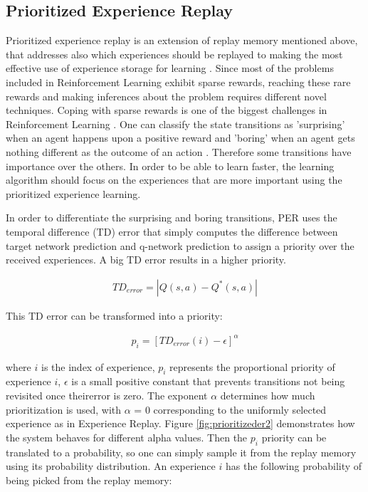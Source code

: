 \documentclass{ituphdreport}
\begin{document}
\subsection{Prioritized Experience Replay}
Prioritized experience replay is an extension of replay memory mentioned above, that addresses also which experiences should be replayed to making the most effective use of experience storage for learning \cite{schaul2015prioritized}. Since most of the problems included in Reinforcement Learning exhibit sparse rewards, reaching these rare rewards and making inferences about the problem requires different novel techniques. Coping with sparse rewards is one of the biggest challenges in Reinforcement Learning \cite{andrychowicz2017hindsight}. One can classify the state transitions as 'surprising' when an agent happens upon a positive reward and 'boring' when an agent gets nothing different as the outcome of an action \cite{kaelbling1996reinforcement}. Therefore some transitions have importance over the others. In order to be able to learn faster, the learning algorithm should focus on the experiences that are more important using the prioritized experience learning. 

In order to differentiate the surprising and boring transitions, PER uses the temporal difference (TD) error that simply computes the difference between target network prediction and q-network prediction to assign a priority over the received experiences. A big TD error results in a higher priority. 

\begin{equation}
\begin{aligned}
TD_{error} = | Q(s,a) - Q^*(s,a)|
\end{aligned}
\end{equation}

This TD error can be transformed into a priority:

\begin{equation}
\begin{aligned}
p_i = [TD_{error}(i) - \epsilon]^\alpha
\end{aligned}
\end{equation}

where $i$ is the index of experience, $p_i$ represents the proportional priority of experience $i$, $\epsilon$ is a small positive constant that prevents transitions not being revisited once theirerror is zero. The exponent  $\alpha$ determines how much prioritization is
used, with $\alpha$ = 0 corresponding to the uniformly selected experience as in Experience Replay. Figure \ref{fig:prioritizeder2} demonstrates how the system behaves for different alpha values. Then the $p_i$ priority can be translated to a probability, so one can simply sample it from the replay memory using its probability distribution. An experience $i$ has the following probability of being picked from the replay memory:
\end{document}
